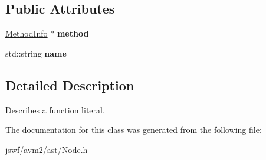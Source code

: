 \subsection*{Public Attributes}
\begin{DoxyCompactItemize}
\item 
\hypertarget{classjswf_1_1avm2_1_1ast_1_1_function_node_a05b7fd3a985147d18c03182f41103196}{\hyperlink{structjswf_1_1avm2_1_1_method_info}{Method\+Info} $\ast$ {\bfseries method}}\label{classjswf_1_1avm2_1_1ast_1_1_function_node_a05b7fd3a985147d18c03182f41103196}

\item 
\hypertarget{classjswf_1_1avm2_1_1ast_1_1_function_node_a74b195c0bb260375dab6e195b7756d4c}{std\+::string {\bfseries name}}\label{classjswf_1_1avm2_1_1ast_1_1_function_node_a74b195c0bb260375dab6e195b7756d4c}

\end{DoxyCompactItemize}


\subsection{Detailed Description}
Describes a function literal. 

The documentation for this class was generated from the following file\+:\begin{DoxyCompactItemize}
\item 
jswf/avm2/ast/Node.\+h\end{DoxyCompactItemize}
